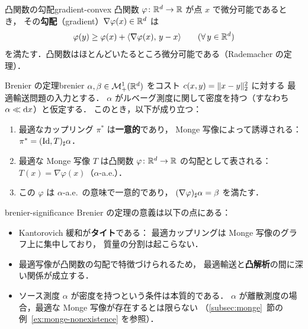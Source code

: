 \begin{definition}{凸関数の勾配}{gradient-convex}
  凸関数 $\varphi \colon \mathbb{R}^d \to \mathbb{R}$ が点 $x$ で微分可能であるとき，
  その\textbf{勾配}（gradient）$\nabla\varphi(x) \in \mathbb{R}^d$ は
  \[
    \varphi(y) \geq \varphi(x) + \langle \nabla\varphi(x),\, y - x \rangle
    \qquad (\forall\, y \in \mathbb{R}^d)
  \]
  を満たす．凸関数はほとんどいたるところ微分可能である（Rademacher の定理）．
\end{definition}

\begin{theorem}{Brenier の定理}{brenier}
  $\alpha, \beta \in \mathcal{M}_+^1(\mathbb{R}^d)$ をコスト $c(x, y) = \lVert x - y \rVert_2^2$ に対する
  最適輸送問題の入力とする．
  $\alpha$ がルベーグ測度に関して密度を持つ（すなわち $\alpha \ll \mathrm{d} x$）と仮定する．
  このとき，以下が成り立つ：
  \begin{enumerate}
    \item 最適なカップリング $\pi^*$ は\textbf{一意的}であり，
      Monge 写像によって誘導される：$\pi^* = (\operatorname{Id}, T)_\sharp \alpha$．
    \item 最適な Monge 写像 $T$ は凸関数 $\varphi \colon \mathbb{R}^d \to \mathbb{R}$ の勾配として表される：
      $T(x) = \nabla\varphi(x)$（$\alpha$-a.e.）．
    \item この $\varphi$ は $\alpha$-a.e.\ の意味で一意的であり，
      $(\nabla\varphi)_\sharp \alpha = \beta$ を満たす．
  \end{enumerate}
\end{theorem}

\begin{remark}{}{brenier-significance}
  Brenier の定理の意義は以下の点にある：
  \begin{itemize}
    \item Kantorovich 緩和が\textbf{タイト}である：
      最適カップリングは Monge 写像のグラフ上に集中しており，
      質量の分割は起こらない．
    \item 最適写像が凸関数の勾配で特徴づけられるため，
      最適輸送と\textbf{凸解析}の間に深い関係が成立する．
    \item ソース測度 $\alpha$ が密度を持つという条件は本質的である．
      $\alpha$ が離散測度の場合，最適な Monge 写像が存在するとは限らない
      （\ref{subsec:monge}~節の例~\ref{ex:monge-nonexistence} を参照）．
  \end{itemize}
\end{remark}

